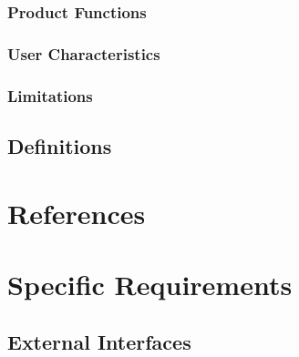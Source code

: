 \subsubsection{Product Functions}

\subsubsection{User Characteristics}

\subsubsection{Limitations}

\subsection{Definitions}

\section{References}

\section{Specific Requirements}


\subsection{External Interfaces}


